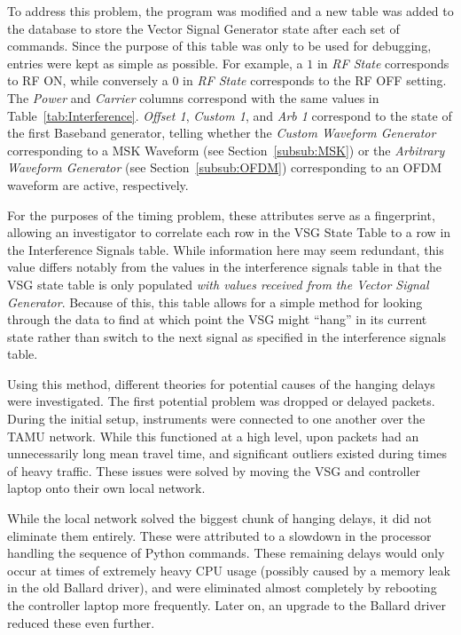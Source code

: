 To address this problem, the program was modified and a new table was added to the database to store the Vector Signal Generator state after each set of commands. Since the purpose of this table was only to be used for debugging, entries were kept as simple as possible. For example, a $1$ in \textit{RF State} corresponds to RF ON, while conversely a $0$ in \textit{RF State} corresponds to the RF OFF setting. The \textit{Power} and \textit{Carrier} columns correspond with the same values in Table~\ref{tab:Interference}. \textit{Offset 1}, \textit{Custom 1}, and \textit{Arb 1} correspond to the state of the first Baseband generator, telling whether the \textit{Custom Waveform Generator} corresponding to a MSK Waveform (see Section~\ref{subsub:MSK}) or the \textit{Arbitrary Waveform Generator} (see Section~\ref{subsub:OFDM}) corresponding to an OFDM waveform are active, respectively. 
 
For the purposes of the timing problem, these attributes serve as a fingerprint, allowing an investigator to correlate each row in the VSG State Table to a row in the Interference Signals table. While information here may seem redundant, this value differs notably from the values in the interference signals table in that the VSG state table is only populated \textit{with values received from the Vector Signal Generator}. Because of this, this table allows for a simple method for looking through the data to find at which point the VSG might ``hang'' in its current state rather than switch to the next signal as specified in the interference signals table. 

Using this method, different theories for potential causes of the hanging delays were investigated. The first potential problem was dropped or delayed packets. During the initial setup, instruments were connected to one another over the TAMU network. While this functioned at a high level, upon packets had an unnecessarily long mean travel time, and significant outliers existed during times of heavy traffic. These issues were solved by moving the VSG and controller laptop onto their own local network. 

 While the local network solved the biggest chunk of hanging delays, it did not eliminate them entirely. These were attributed to a slowdown in the processor handling the sequence of Python commands. These remaining delays would only occur at times of extremely heavy CPU usage (possibly caused by a memory leak in the old Ballard driver), and were eliminated almost completely by rebooting the controller laptop more frequently. Later on, an upgrade to the Ballard driver reduced these even further. 
 
